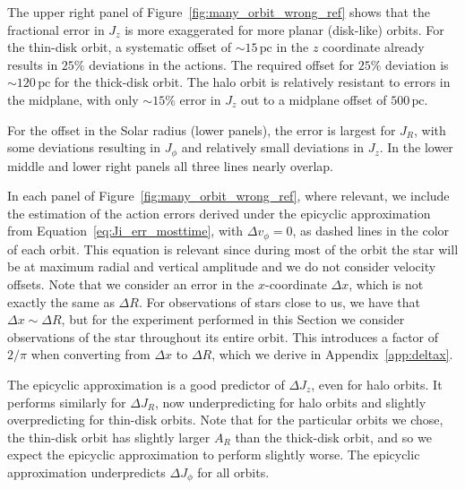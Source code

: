 \documentclass[twocolumn]{aastex62}
\newcommand{\pc}{\text{pc}}
\begin{document}
The upper right panel of Figure~\ref{fig:many_orbit_wrong_ref} shows that the
fractional error in $J_z$ is more exaggerated for more planar (disk-like)
orbits. For the thin-disk orbit, a systematic offset of $\sim15\,\pc$ in the
$z$ coordinate already results in $25\%$ deviations in the actions. The
required offset for $25\%$ deviation is $\sim120\,\pc$ for the thick-disk
orbit. The halo orbit is relatively resistant to errors in the midplane, with
only $\sim15\%$ error in $J_z$ out to a midplane offset of $500\,\pc$.

For the offset in the Solar radius (lower panels), the error is largest for
$J_R$, with some deviations resulting in $J_{\phi}$ and relatively small
deviations in $J_z$. In the lower middle and lower right panels all three
lines nearly overlap.

In each panel of Figure~\ref{fig:many_orbit_wrong_ref}, where relevant, we
include the estimation of the action errors derived under the epicyclic
approximation from Equation~\eqref{eq:Ji_err_mosttime}, with $\Delta
v_{\phi}=0$, as dashed lines in the color of each orbit. This equation is
relevant since during most of the orbit the star will be at maximum radial and
vertical amplitude and we do not consider velocity offsets. Note that we
consider an error in the $x$-coordinate $\Delta x$, which is not exactly the
same as $\Delta R$. For observations of stars close to us, we have that
$\Delta x \sim \Delta R$, but for the experiment performed in this Section we
consider observations of the star throughout its entire orbit. This introduces
a factor of $2/\pi$ when converting from $\Delta x$ to $\Delta R$, which we
derive in Appendix~\ref{app:deltax}.

The epicyclic approximation is a good predictor of $\Delta J_z$, even for halo
orbits. It performs similarly for $\Delta J_R$, now underpredicting for halo
orbits and slightly overpredicting for thin-disk orbits. Note that for the
particular orbits we chose, the thin-disk orbit has slightly larger $A_R$ than
the thick-disk orbit, and so we expect the epicyclic approximation to perform
slightly worse. The epicyclic approximation underpredicts $\Delta J_{\phi}$
for all orbits.
\end{document}
